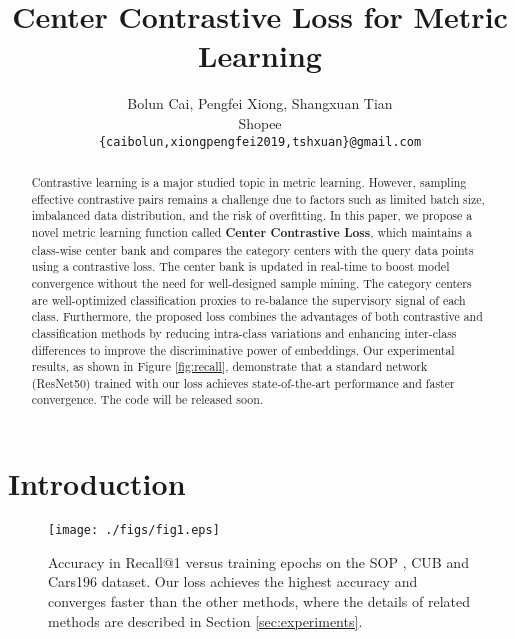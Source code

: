 \documentclass[10pt,twocolumn,letterpaper]{article}
\begin{document}
\title{Center Contrastive Loss for Metric Learning}

\author{Bolun Cai, Pengfei Xiong, Shangxuan Tian \\
Shopee\\
{\tt\small \{caibolun,xiongpengfei2019,tshxuan\}@gmail.com}
}

\maketitle
\ificcvfinal\thispagestyle{empty}\fi


\begin{abstract}


Contrastive learning is a major studied topic in metric learning. However, sampling effective contrastive pairs remains a challenge due to factors such as limited batch size, imbalanced data distribution, and the risk of overfitting. In this paper, we propose a novel metric learning function called \textbf{Center Contrastive Loss}, which maintains a class-wise center bank and compares the category centers with the query data points using a contrastive loss. The center bank is updated in real-time to boost model convergence without the need for well-designed sample mining. The category centers are well-optimized classification proxies to re-balance the supervisory signal of each class. Furthermore, the proposed loss combines the advantages of both contrastive and classification methods by reducing intra-class variations and enhancing inter-class differences to improve the discriminative power of embeddings. Our experimental results, as shown in Figure \ref{fig:recall}, demonstrate that a standard network (ResNet50) trained with our loss achieves state-of-the-art performance and faster convergence. The code will be released soon.

\end{abstract}

\section{Introduction}
\begin{figure}[ht!]
\centering  
\texttt{[image: ./figs/fig1.eps]} 
\caption{
Accuracy in Recall@1 versus training epochs on the SOP \cite{liftstruct}, CUB \cite{cub} and Cars196 \cite{car} dataset. Our loss achieves the highest accuracy and converges faster than the other methods, where the details of related methods are described in Section \ref{sec:experiments}.}  
\label{fig:recall}  
\end{figure}
\end{document}
